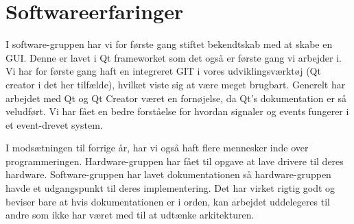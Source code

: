 \section{Softwareerfaringer}

I software-gruppen har vi for første gang stiftet bekendtskab med at skabe en GUI. Denne er lavet i Qt frameworket som det også er første gang vi arbejder i. Vi har for første gang haft en integreret GIT i vores udviklingsværktøj (Qt creator i det her tilfælde), hvilket viste sig at være meget brugbart. Generelt har arbejdet med Qt og Qt Creator været en fornøjelse, da Qt's dokumentation er så veludført. Vi har fået en bedre forståelse for hvordan signaler og events fungerer i et event-drevet system.

I modsætningen til forrige år, har vi også haft flere mennesker inde over programmeringen. Hardware-gruppen har fået til opgave at lave drivere til deres hardware. Software-gruppen har lavet dokumentationen så hardware-gruppen havde et udgangspunkt til deres implementering. Det har virket rigtig godt og beviser bare at hvis dokumentationen er i orden, kan arbejdet uddelegeres til andre som ikke har været med til at udtænke arkitekturen.